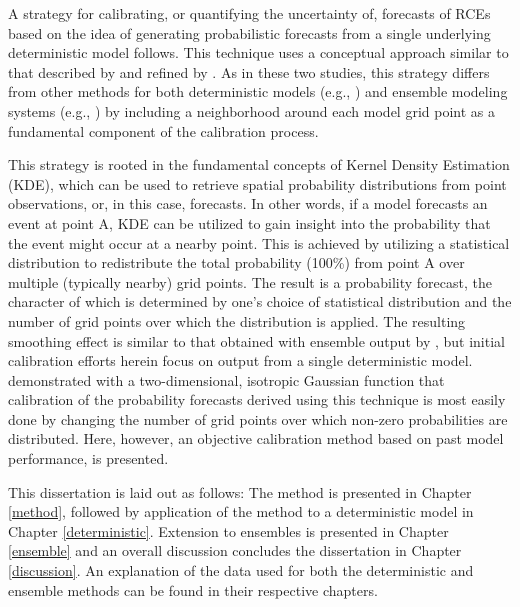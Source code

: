 A strategy for calibrating, or quantifying the uncertainty of, forecasts of RCEs based on the idea of generating probabilistic forecasts from a single underlying deterministic model follows.
This technique uses a conceptual approach similar to that described by \cite{Theis2005} and refined by \cite{Sobash2011}.
As in these two studies, this strategy differs from other methods for both deterministic models (e.g., \citealp{Glahn1972}) and ensemble modeling systems (e.g., \citealp{Hamill1998, Raftery2005, Clark2009, Glahn2009}) by including a neighborhood around each model grid point as a fundamental component of the calibration process.


This strategy is rooted in the fundamental concepts of Kernel Density Estimation (KDE), which can be used to retrieve spatial probability distributions from point observations, or, in this case, forecasts.
In other words, if a model forecasts an event at point A, KDE can be utilized to gain insight into the probability that the event might occur at a nearby point.
This is achieved by utilizing a statistical distribution to redistribute the total probability (100\%) from point A over multiple (typically nearby) grid points.
The result is a probability forecast, the character of which is determined by one's choice of statistical distribution and the number of grid points over which the distribution is applied.
The resulting smoothing effect is similar to that obtained with ensemble output by \cite{Wilks2002}, but initial calibration efforts herein focus on output from a single deterministic model.
\cite{Sobash2011} demonstrated with a two-dimensional, isotropic Gaussian function that calibration of the probability forecasts derived using this technique is most easily done by changing the number of grid points over which non-zero probabilities are distributed.
Here, however, an objective calibration method based on past model performance, is presented.


This dissertation is laid out as follows: The method is presented in Chapter \ref{method}, followed by application of the method to a deterministic model in Chapter \ref{deterministic}.
Extension to ensembles is presented in Chapter \ref{ensemble} and an overall discussion concludes the dissertation in Chapter \ref{discussion}.
An explanation of the data used for both the deterministic and ensemble methods can be found in their respective chapters.


